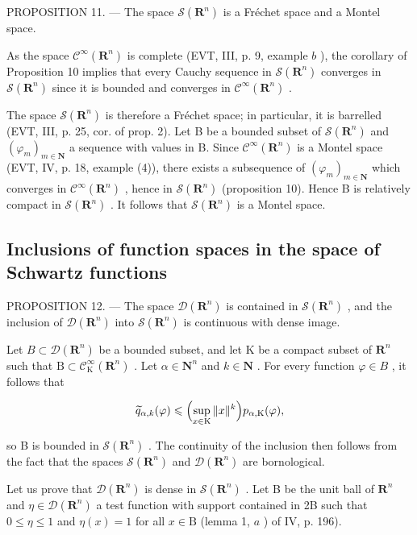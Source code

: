 PROPOSITION 11. --- The space \(\mathcal{S}(\mathbf{R}^{n})\) is a Fréchet space and a Montel space.

As the space \(\mathcal{C}^{\infty}(\mathbf{R}^{n})\) is complete (EVT, III, p. 9, example \(b\) ), the corollary of Proposition 10 implies that every Cauchy sequence in \(\mathcal{S}(\mathbf{R}^{n})\) converges in \(\mathcal{S}(\mathbf{R}^{n})\) since it is bounded and converges in \(\mathcal{C}^{\infty}(\mathbf{R}^{n})\) .

The space \(\mathcal{S}(\mathbf{R}^n)\) is therefore a Fréchet space; in particular, it is barrelled (EVT, III, p. 25, cor. of prop. 2). Let B be a bounded subset of \(\mathcal{S}(\mathbf{R}^n)\) and \((\varphi_m)_{m \in \mathbf{N}}\) a sequence with values in B. Since \(\mathcal{C}^\infty(\mathbf{R}^n)\) is a Montel space (EVT, IV, p. 18, example (4)), there exists a subsequence of \((\varphi_m)_{m \in \mathbf{N}}\) which converges in \(\mathcal{C}^\infty(\mathbf{R}^n)\) , hence in \(\mathcal{S}(\mathbf{R}^n)\) (proposition 10). Hence B is relatively compact in \(\mathcal{S}(\mathbf{R}^n)\) . It follows that \(\mathcal{S}(\mathbf{R}^n)\) is a Montel space.

\subsection{Inclusions of function spaces in the space of Schwartz functions}

PROPOSITION 12. — The space \(\mathcal{D}(\mathbf{R}^{n})\) is contained in \(\mathcal{S}(\mathbf{R}^{n})\) , and the inclusion of \(\mathcal{D}(\mathbf{R}^{n})\) into \(\mathcal{S}(\mathbf{R}^{n})\) is continuous with dense image.

Let \(B \subset \mathcal{D}(\mathbf{R}^{n})\) be a bounded subset, and let K be a compact subset of \(\mathbf{R}^{n}\) such that \(\mathrm{B} \subset \mathcal{C}_{\mathrm{K}}^{\infty}(\mathbf{R}^{n})\) . Let \(\alpha \in \mathbf{N}^{n}\) and \(k \in \mathbf{N}\) . For every function \(\varphi \in B\) , it follows that

\[
\widetilde {q} _ {\alpha , k} (\varphi) \leqslant \Bigl (\sup _ {x \in \mathrm{K}} \| x \| ^ {k} \Bigr) p _ {\alpha , \mathrm{K}} (\varphi),
\]

so B is bounded in \(\mathcal{S}(\mathbf{R}^{n})\) . The continuity of the inclusion then follows from the fact that the spaces \(\mathcal{S}(\mathbf{R}^{n})\) and \(\mathcal{D}(\mathbf{R}^{n})\) are bornological.

Let us prove that \(\mathcal{D}(\mathbf{R}^n)\) is dense in \(\mathcal{S}(\mathbf{R}^n)\) . Let B be the unit ball of \(\mathbf{R}^n\) and \(\eta \in \mathcal{D}(\mathbf{R}^n)\) a test function with support contained in 2B such that \(0 \leqslant \eta \leqslant 1\) and \(\eta(x) = 1\) for all \(x \in \mathrm{B}\) (lemma 1, \(a\) ) of IV, p. 196).

